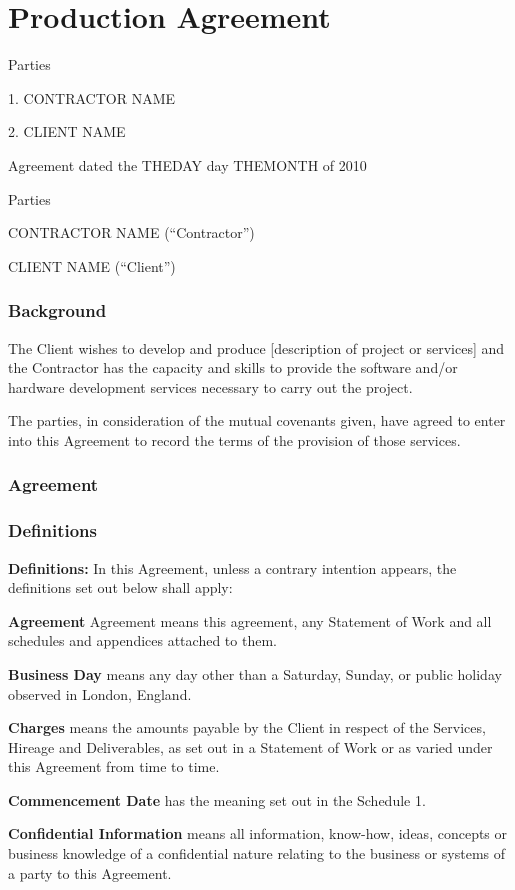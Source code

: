 \documentclass[a4paper,12pt]{article}
\newcommand{\contractDay}{THEDAY }
\newcommand{\contractMonth}{THEMONTH }
\newcommand{\contractorName}{CONTRACTOR NAME }
\newcommand{\clientName}{CLIENT NAME }
\begin{document}
\part*{Production Agreement}

Parties

1.	\contractorName

2.	\clientName

\vspace{90 mm}


\newpage
Agreement dated the \contractDay day \contractMonth of 2010

Parties

\contractorName (``Contractor'') 

\clientName (``Client'')

\section*{Background}
The Client wishes to develop and produce [description of project or services] and the Contractor has the capacity and skills to provide the software and/or hardware development services necessary to carry out the project.

The parties, in consideration of the mutual covenants given, have agreed to enter into this Agreement to record the terms of the provision of those services.
\section*{Agreement}
\section{Definitions}
\textbf{Definitions:}  In this Agreement, unless a contrary intention appears, the definitions set out below shall apply:

\textbf{Agreement} Agreement means this agreement, any Statement of Work and all schedules and appendices attached to them.

\textbf{Business Day} means any day other than a Saturday, Sunday, or public holiday observed in London, England.

\textbf{Charges} means the amounts payable by the Client in respect of the Services, Hireage and Deliverables, as set out in a Statement of Work or as varied under this Agreement from time to time.

\textbf{Commencement Date} has the meaning set out in the Schedule 1.

\textbf{Confidential Information} means all information, know-how, ideas, concepts or business knowledge of a confidential nature relating to the business or systems of a party to this Agreement.
\end{document}
